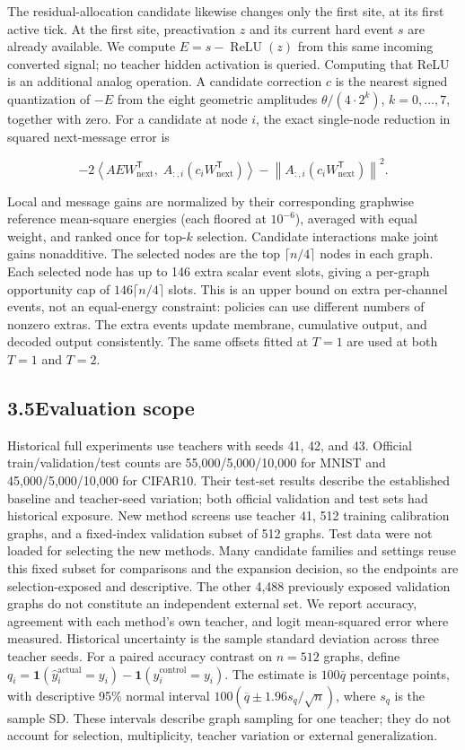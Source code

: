 \documentclass[11pt]{article}
\begin{document}
The residual-allocation candidate likewise changes only the first site, at its first active tick. At the first site, preactivation $z$ and its current hard event $s$ are already available. We compute $E=s-\operatorname{ReLU}(z)$ from this same incoming converted signal; no teacher hidden activation is queried. Computing that ReLU is an additional analog operation. A candidate correction $c$ is the nearest signed quantization of $-E$ from the eight geometric amplitudes $\theta/(4\cdot 2^k)$, $k=0,\ldots,7$, together with zero. For a candidate at node $i$, the exact single-node reduction in squared next-message error is

\[
-2\left\langle A E W_{\mathrm{next}}^{\mathsf T},\; A_{:,i}(c_iW_{\mathrm{next}}^{\mathsf T})\right\rangle
-\left\|A_{:,i}(c_iW_{\mathrm{next}}^{\mathsf T})\right\|^2.
\]

Local and message gains are normalized by their corresponding graphwise reference mean-square energies (each floored at $10^{-6}$), averaged with equal weight, and ranked once for top-$k$ selection. Candidate interactions make joint gains nonadditive. The selected nodes are the top $\lceil n/4\rceil$ nodes in each graph. Each selected node has up to 146 extra scalar event slots, giving a per-graph opportunity cap of $146\lceil n/4\rceil$ slots. This is an upper bound on extra per-channel events, not an equal-energy constraint: policies can use different numbers of nonzero extras. The extra events update membrane, cumulative output, and decoded output consistently. The same offsets fitted at $T=1$ are used at both $T=1$ and $T=2$.

\subsection*{3.5\quad Evaluation scope}

Historical full experiments use teachers with seeds 41, 42, and 43. Official train/validation/test counts are 55,000/5,000/10,000 for MNIST and 45,000/5,000/10,000 for CIFAR10. Their test-set results describe the established baseline and teacher-seed variation; both official validation and test sets had historical exposure. New method screens use teacher 41, 512 training calibration graphs, and a fixed-index validation subset of 512 graphs. Test data were not loaded for selecting the new methods. Many candidate families and settings reuse this fixed subset for comparisons and the expansion decision, so the endpoints are selection-exposed and descriptive. The other 4,488 previously exposed validation graphs do not constitute an independent external set. We report accuracy, agreement with each method's own teacher, and logit mean-squared error where measured. Historical uncertainty is the sample standard deviation across three teacher seeds. For a paired accuracy contrast on $n=512$ graphs, define $q_i=\mathbf{1}(\hat y_i^{\mathrm{actual}}=y_i)-\mathbf{1}(\hat y_i^{\mathrm{control}}=y_i)$. The estimate is $100\overline q$ percentage points, with descriptive 95\% normal interval $100(\overline q\pm1.96s_q/\sqrt n)$, where $s_q$ is the sample SD. These intervals describe graph sampling for one teacher; they do not account for selection, multiplicity, teacher variation or external generalization.
\end{document}
